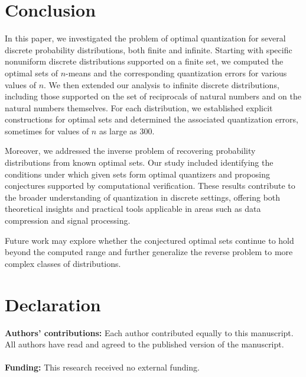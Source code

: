 \documentclass[12pt, reqno]{amsart}
\theoremstyle{plain}
\theoremstyle{definition}
\newcommand{\tbf}{\textbf}%
\begin{document}
\section{Conclusion}
In this paper, we investigated the problem of optimal quantization for several discrete probability distributions, both finite and infinite. Starting with specific nonuniform discrete distributions supported on a finite set, we computed the optimal sets of $n$-means and the corresponding quantization errors for various values of 
$n$. We then extended our analysis to infinite discrete distributions, including those supported on the set of reciprocals of natural numbers and on the natural numbers themselves. For each distribution, we established explicit constructions for optimal sets and determined the associated quantization errors, sometimes for values of 
$n$ as large as 300.

Moreover, we addressed the inverse problem of recovering probability distributions from known optimal sets. Our study included identifying the conditions under which given sets form optimal quantizers and proposing conjectures supported by computational verification. These results contribute to the broader understanding of quantization in discrete settings, offering both theoretical insights and practical tools applicable in areas such as data compression and signal processing.

Future work may explore whether the conjectured optimal sets continue to hold beyond the computed range and further generalize the reverse problem to more complex classes of distributions.


\section*{Declaration}
							
							\noindent
\textbf{Authors' contributions:} Each author contributed equally to this manuscript. All authors have read and agreed to the published version of the manuscript.\\
\\
\noindent \tbf{Funding:}  This research received no external funding.\\
							
\end{document}
